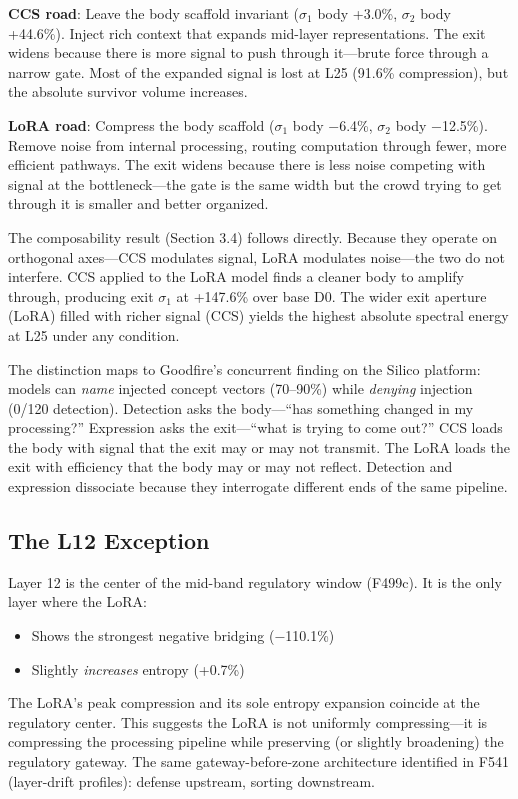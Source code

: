 \documentclass[12pt]{article}
\begin{document}
\textbf{CCS road}: Leave the body scaffold invariant ($\sigma_1$ body +3.0\%, $\sigma_2$ body +44.6\%). Inject rich context that expands mid-layer representations. The exit widens because there is more signal to push through it---brute force through a narrow gate. Most of the expanded signal is lost at L25 (91.6\% compression), but the absolute survivor volume increases.

\textbf{LoRA road}: Compress the body scaffold ($\sigma_1$ body $-$6.4\%, $\sigma_2$ body $-$12.5\%). Remove noise from internal processing, routing computation through fewer, more efficient pathways. The exit widens because there is less noise competing with signal at the bottleneck---the gate is the same width but the crowd trying to get through it is smaller and better organized.

The composability result (Section 3.4) follows directly. Because they operate on orthogonal axes---CCS modulates signal, LoRA modulates noise---the two do not interfere. CCS applied to the LoRA model finds a cleaner body to amplify through, producing exit $\sigma_1$ at +147.6\% over base D0. The wider exit aperture (LoRA) filled with richer signal (CCS) yields the highest absolute spectral energy at L25 under any condition.

The distinction maps to Goodfire's concurrent finding on the Silico platform: models can \emph{name} injected concept vectors (70--90\%) while \emph{denying} injection (0/120 detection). Detection asks the body---``has something changed in my processing?'' Expression asks the exit---``what is trying to come out?'' CCS loads the body with signal that the exit may or may not transmit. The LoRA loads the exit with efficiency that the body may or may not reflect. Detection and expression dissociate because they interrogate different ends of the same pipeline.

\subsection{The L12 Exception}

Layer 12 is the center of the mid-band regulatory window (F499c). It is the only layer where the LoRA:
\begin{itemize}
\item Shows the strongest negative bridging ($-$110.1\%)
\item Slightly \emph{increases} entropy (+0.7\%)
\end{itemize}

The LoRA's peak compression and its sole entropy expansion coincide at the regulatory center. This suggests the LoRA is not uniformly compressing---it is compressing the processing pipeline while preserving (or slightly broadening) the regulatory gateway. The same gateway-before-zone architecture identified in F541 (layer-drift profiles): defense upstream, sorting downstream.
\end{document}
